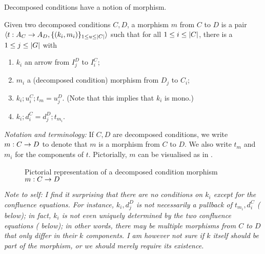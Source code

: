 Decomposed conditions have a notion of morphism.

\begin{definition}
  Given two decomposed conditions $C,D$, a morphism $m$ from $C$ to $D$ is a pair $\langle{t:A_C\rightarrow A_D,\{{(k_i,m_i)}\}_{1\leq u\leq |{C}|}}\rangle$ such that for all $1\leq i\leq |{C}|$, there is a $1\leq j\leq |{G}|$ with
  \begin{enumerate}
  \item $k_i$ an arrow from $I_j^D$ to $I_i^C$;
  \item $m_i$ a (decomposed condition) morphism from $D_j$ to $C_i$;
  \item $k_i;u_i^C;t_m=u_j^D$. (Note that this implies that $k_i$ is mono.)
  \item $k_i;d_i^C=d_j^D;t_{m_i}$.
  \end{enumerate}
\end{definition}
%
\emph{Notation and terminology:} If $C,D$ are decomposed conditions, we write $m:C\rightarrow D$ to denote that $m$ is a morphism from $C$ to $D$. We also write $t_m$ and $m_i$ for the components of $t$. Pictorially, $m$ can be visualised as in .
%
\begin{figure}
  \centering
  
  \caption{Pictorial representation of a decomposed condition morphism $m:C\rightarrow D$}
\end{figure}

\medskip\noindent
\emph{Note to self: I find it surprising that there are no conditions on $k_i$ except for the confluence equations. For instance, $k_i,d_j^D$ is \emph{not} necessarily a pullback of $t_{m_i},d_i^C$ ( below); in fact, $k_i$ is \emph{not even} uniquely determined by the two confluence equations ( below); in other words, there may be multiple morphisms from $C$ to $D$ that only differ in their $k$ components. I am however not sure if $k$ itself should be part of the morphism, or we should merely require its existence.}

